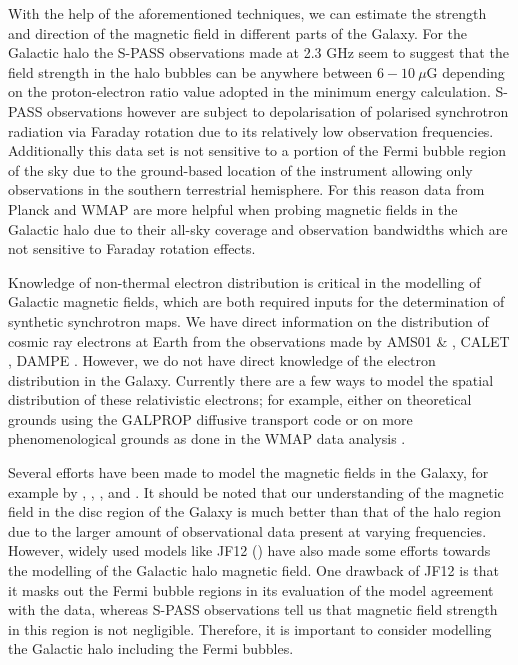 \documentclass[usenatbib]{mnras}
\begin{document}
With the help of the aforementioned techniques, we can estimate the strength and direction of the magnetic field in different parts of the Galaxy. 
For the Galactic halo the S-PASS \cite{Carretti_2013} observations  made at 2.3 GHz seem to suggest that the field strength in the halo bubbles can be anywhere between $6-10~\mu $G depending on the proton-electron ratio value adopted in the minimum energy calculation. S-PASS \cite{Carretti_2013} observations however are subject to depolarisation of polarised synchrotron radiation via Faraday rotation due to its relatively low observation frequencies. Additionally this data set is not sensitive to a portion of the Fermi bubble region of the sky due to the ground-based location of the instrument allowing only observations in the southern terrestrial hemisphere. For this reason data from Planck and WMAP are more helpful when probing magnetic fields in the Galactic halo due to their all-sky coverage and observation bandwidths which are not sensitive to Faraday rotation effects.

Knowledge of non-thermal electron distribution is critical in the modelling of Galactic magnetic fields, which are both required inputs for the determination of synthetic synchrotron maps.
We have direct information on the distribution of cosmic ray electrons at Earth from the observations made by AMS01 \cite{AMS_2002} \& \cite{AMS_2014}, CALET \cite{Calet_2017}, DAMPE \cite{Dampe_2017}. However, we do not have direct knowledge of the electron distribution in the Galaxy.
Currently there are a few ways to model the spatial distribution of these relativistic electrons; for example, either on theoretical grounds using the GALPROP diffusive transport code \cite{Hammurabi} \cite{Orlando_2011} or on more phenomenological grounds as done in the WMAP data analysis \cite{WMAP_Page}.


Several efforts have been made to model the magnetic fields in the Galaxy, for example by \cite{Jaffe_2010}, \cite{Jaffe_2011}, \cite{Sun_2008}, and \cite{JF12}. It should be noted that our understanding of the magnetic field in the disc region of the Galaxy is much better than that of the halo region due to the larger amount of observational data present at varying frequencies. However, widely used models like JF12 (\cite{JF12}) have also made some efforts towards the modelling of the Galactic halo magnetic field. One drawback of JF12 is that it masks out the Fermi bubble regions in its evaluation of the model agreement with the data, whereas S-PASS \cite{Carretti_2013} observations tell us that magnetic field strength in this region is not negligible. Therefore, it is important to consider modelling the Galactic halo including the Fermi bubbles.
\end{document}
